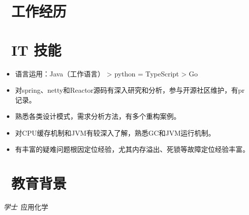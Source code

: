 \documentclass{resume}
\begin{document}
\section{\faUsers\ 工作经历}




\section{\faCogs\ IT 技能}
\begin{itemize}[parsep=0.5ex]
  \item 语言运用：Java（工作语言） > python = TypeScript > Go
  \item 对spring、netty和Reactor源码有深入研究和分析，参与开源社区维护，有pr记录。
  \item 熟悉各类设计模式，需求分析方法，有多个重构案例。
  \item 对CPU缓存机制和JVM有较深入了解，熟悉GC和JVM运行机制。
  \item 有丰富的疑难问题根因定位经验，尤其内存溢出、死锁等故障定位经验丰富。
\end{itemize}

\section{\faGraduationCap\  教育背景}
\textit{学士}\ 应用化学

\end{document}
